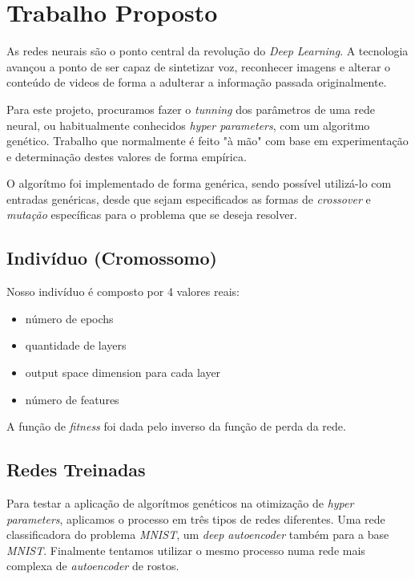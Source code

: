 \documentclass[twoside,conference,a4paper]{IEEEtran}
\begin{document}
\section{Trabalho Proposto}

As redes neurais são o ponto central da revolução do \emph{Deep Learning}. A tecnologia avançou a ponto de ser capaz de sintetizar voz, reconhecer imagens e alterar o conteúdo de videos de forma a adulterar a informação passada originalmente.

Para este projeto, procuramos fazer o \emph{tunning} dos parâmetros de uma rede neural, ou habitualmente conhecidos \emph{hyper parameters}, com um algoritmo genético. Trabalho que normalmente é feito "à mão" com base em experimentação e determinação destes valores de forma empírica.

O algorítmo foi implementado de forma genérica, sendo possível utilizá-lo com entradas genéricas, desde que sejam especificados as formas de \emph{crossover} e \emph{mutação} específicas para o problema que se deseja resolver.



\subsection{Indivíduo (Cromossomo)}

Nosso indivíduo é composto por 4 valores reais:

\begin{itemize}
    \item número de epochs
    \item quantidade de layers
    \item output space dimension para cada layer
    \item número de features
\end{itemize}

A função de \emph{fitness} foi dada pelo inverso da função de perda da rede.

\subsection{Redes Treinadas}
Para testar a aplicação de algorítmos genéticos na otimização de \emph{hyper parameters}, aplicamos o processo em três tipos de redes diferentes. Uma rede classificadora do problema \emph{MNIST}, um \emph{deep autoencoder} também para a base \emph{MNIST}. Finalmente tentamos utilizar o mesmo processo numa rede mais complexa de \emph{autoencoder} de rostos.
\end{document}

